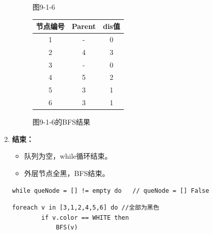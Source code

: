 \documentclass{article}
\begin{document}
\begin{enumerate}
\begin{figure}[htbp]
\begin{minipage}[b]{0.6\textwidth}
            \caption{图9-1-6}
            \label{fig:9-1-6}
        \end{minipage}%
        \hfill%
        \begin{minipage}[b]{0.4\textwidth}    %
            \centering
            \begin{tabular}{|c|c|c|}
                \hline
                节点编号 & Parent & dis值 \\
                \hline
                1 & - & 0 \\
                2 & 4 & 3 \\
                3 & - & 0 \\
                4 & 5 & 2 \\
                5 & 3 & 1 \\
                6 & 3 & 1 \\
                \hline
            \end{tabular}
            \caption{图9-1-6的BFS结果}
            \label{tab:graph9-1-6-bfs}
        \end{minipage}
    \end{figure}


    \item \textbf{结束：}

    \begin{itemize}
        \item 队列为空，while循环结束。
        \item 外层节点全黑，BFS结束。
    \end{itemize}

    \begin{lstlisting}[style=algorithmPPT]
                while queNode = [] != empty do   // queNode = [] False
        \end{lstlisting}    

    \begin{lstlisting}[style=algorithmPPT]
    foreach v in [3,1,2,4,5,6] do //全部为黑色
        if v.color == WHITE then
            BFS(v)
        \end{lstlisting}


\end{enumerate}
\end{document}

